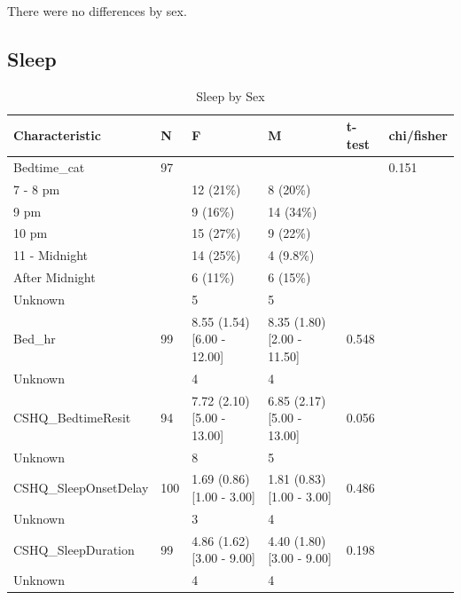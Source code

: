 \documentclass[
]{article}
\begin{document}
There were no differences by sex.

\FloatBarrier
\clearpage

\hypertarget{sleep-1}{%
\subsection{Sleep}\label{sleep-1}}

\begin{table}[!h]

\caption{\label{tab:Beh_sex_tab}Sleep by Sex}
\centering
\begin{tabular}[t]{llllll}
\toprule
Characteristic & N & F & M & t-test & chi/fisher\\
\midrule
Bedtime\_cat & 97 &  &  &  & 0.151\\
\hspace{1em}7 - 8 pm &  & 12 (21\%) & 8 (20\%) &  & \\
\hspace{1em}9 pm &  & 9 (16\%) & 14 (34\%) &  & \\
\hspace{1em}10 pm &  & 15 (27\%) & 9 (22\%) &  & \\
\hspace{1em}11 - Midnight &  & 14 (25\%) & 4 (9.8\%) &  & \\
\addlinespace
\hspace{1em}After Midnight &  & 6 (11\%) & 6 (15\%) &  & \\
\hspace{1em}Unknown &  & 5 & 5 &  & \\
Bed\_hr & 99 & 8.55 (1.54)   [6.00 - 12.00] & 8.35 (1.80)   [2.00 - 11.50] & 0.548 & \\
\hspace{1em}Unknown &  & 4 & 4 &  \vphantom{1} & \\
CSHQ\_BedtimeResit & 94 & 7.72 (2.10)   [5.00 - 13.00] & 6.85 (2.17)   [5.00 - 13.00] & 0.056 & \\
\addlinespace
\hspace{1em}Unknown &  & 8 & 5 &  & \\
CSHQ\_SleepOnsetDelay & 100 & 1.69 (0.86)   [1.00 - 3.00] & 1.81 (0.83)   [1.00 - 3.00] & 0.486 & \\
\hspace{1em}Unknown &  & 3 & 4 &  & \\
CSHQ\_SleepDuration & 99 & 4.86 (1.62)   [3.00 - 9.00] & 4.40 (1.80)   [3.00 - 9.00] & 0.198 & \\
\hspace{1em}Unknown &  & 4 & 4 &  & \\

\end{tabular}
\end{table}
\end{document}
